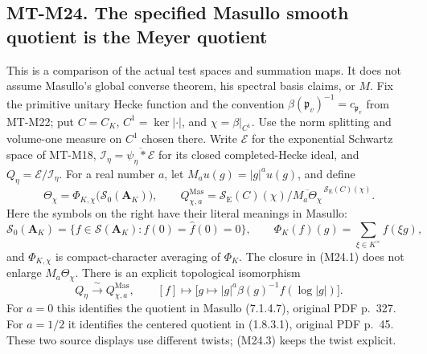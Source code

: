 \subsection*{MT-M24. The specified Masullo smooth quotient is the Meyer quotient}
This is a comparison of the actual test spaces and summation maps. It does
not assume Masullo's global converse theorem, his spectral basis claims,
or $M$. Fix the primitive unitary Hecke function and the convention
$\beta(\mathfrak p_v)^{-1}=c_{\mathfrak p_v}$ from MT-M22; put
$C=C_K$, $C^1=\ker|\cdot|$, and $\chi=\beta|_{C^1}$.
Use the norm splitting and volume-one measure on $C^1$ chosen there.
Write $\mathcal E$ for the exponential Schwartz space of MT-M18,
$\mathcal I_\eta=\overline{\psi_\eta*\mathcal E}$ for its closed
completed-Hecke ideal, and $Q_\eta=\mathcal E/\mathcal I_\eta$.
For a real number $a$, let $M_a u(g)=|g|^a u(g)$, and define
\[
 \Theta_\chi=\Phi_{K,\chi}\bigl(\mathcal S_0(\mathbf A_K)\bigr),
 \qquad
 Q^{\mathrm{Mas}}_{\chi,a}
 =\mathcal S_{\mathrm E}(C)(\chi)\big/
       \overline{M_a\Theta_\chi}^{\,\mathcal S_{\mathrm E}(C)(\chi)}.
 \tag{M24.1}
\]
Here the symbols on the right have their literal meanings in Masullo:
\[
 \mathcal S_0(\mathbf A_K)
  =\{f\in\mathcal S(\mathbf A_K):f(0)=\widehat f(0)=0\},
 \qquad
 \Phi_K(f)(g)=\sum_{\xi\in K^\times}f(\xi g),
 \tag{M24.2}
\]
and $\Phi_{K,\chi}$ is compact-character averaging of $\Phi_K$.
The closure in (M24.1) does not enlarge $M_a\Theta_\chi$.
There is an explicit topological isomorphism
\[
 Q_\eta\xrightarrow{\ \sim\ }Q^{\mathrm{Mas}}_{\chi,a},
 \qquad
 [f]\longmapsto
 \bigl[g\longmapsto |g|^a\beta(g)^{-1}f(\log|g|)\bigr].
 \tag{M24.3}
\]
For $a=0$ this identifies the quotient in Masullo (7.1.4.7),
original PDF p.~327. For $a=1/2$ it identifies the centered quotient
in (1.8.3.1), original PDF p.~45. These two source displays use
different twists; (M24.3) keeps the twist explicit.

